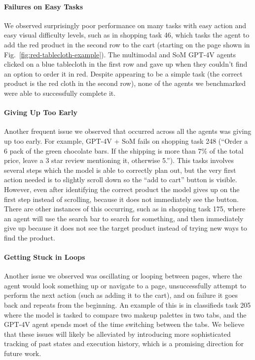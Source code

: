 \paragraph{Failures on Easy Tasks} We observed surprisingly poor performance on many tasks with easy action and easy visual difficulty levels, such as in shopping task 46, which tasks the agent to add the red product in the second row to the cart (starting on the page shown in Fig.~\ref{fig:red-tablecloth-example}). 
The multimodal and SoM GPT-4V agents clicked on a blue tablecloth in the first row and gave up when they couldn't find an option to order it in red. Despite appearing to be a simple task (the correct product is the red cloth in the second row), none of the agents we benchmarked were able to successfully complete it.

\paragraph{Giving Up Too Early} Another frequent issue we observed that occurred across all the agents was giving up too early. For example, GPT-4V + SoM fails on shopping task 248 (``Order a 6 pack of the green chocolate bars. If the shipping is more than 7\% of the total price, leave a 3 star review mentioning it, otherwise 5.''). This tasks involves several steps which the model is able to correctly plan out, but the very first action needed is to slightly scroll down so the ``add to cart'' button is visible. However, even after identifying the correct product the model gives up on the first step instead of scrolling, because it does not immediately see the button. There are other instances of this occurring, such as in shopping task 175, where an agent will use the search bar to search for something, and then immediately give up because it does not see the target product instead of trying new ways to find the product.

\paragraph{Getting Stuck in Loops} Another issue we observed was oscillating or looping between pages, where the agent would look something up or navigate to a page, unsuccessfully attempt to perform the next action (such as adding it to the cart), and on failure it goes back and repeats from the beginning. An example of this is in classifieds task 205 where the model is tasked to compare two makeup palettes in two tabs, and the GPT-4V agent spends most of the time switching between the tabs. We believe that these issues will likely be alleviated by introducing more sophisticated tracking of past states and execution history, which is a promising direction for future work.

